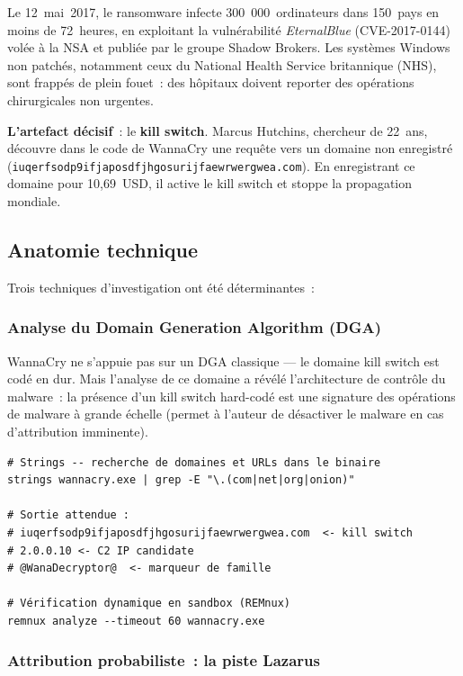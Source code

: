 Le 12~mai~2017, le ransomware  infecte 300~000~ordinateurs
dans 150~pays en moins de 72~heures, en exploitant la vulnérabilité
\textit{EternalBlue} (CVE-2017-0144) volée à la NSA et publiée par le
groupe Shadow Brokers. Les systèmes Windows non patchés, notamment ceux du
National Health Service britannique (NHS), sont frappés de plein fouet~:
des hôpitaux doivent reporter des opérations chirurgicales non urgentes.

\medskip

\textbf{L'artefact décisif}~: le \textbf{kill switch}. Marcus Hutchins,
chercheur de 22~ans, découvre dans le code de WannaCry une requête vers un
domaine non enregistré (\texttt{iuqerfsodp9ifjaposdfjhgosurijfaewrwergwea.com}).
En enregistrant ce domaine pour 10,69~USD, il active le kill switch et stoppe
la propagation mondiale.

\subsection{Anatomie technique}

Trois techniques d'investigation ont été déterminantes~:

\subsubsection{Analyse du Domain Generation Algorithm (DGA)}

WannaCry ne s'appuie pas sur un DGA classique --- le domaine kill switch
est codé en dur. Mais l'analyse de ce domaine a révélé l'architecture de
contrôle du malware~: la présence d'un kill switch hard-codé est une
signature des opérations de malware à grande échelle (permet à l'auteur de
désactiver le malware en cas d'attribution imminente).

\begin{lstlisting}[language=bash_forensique,
    caption={Extraction du kill switch depuis un binaire WannaCry}]
# Strings -- recherche de domaines et URLs dans le binaire
strings wannacry.exe | grep -E "\.(com|net|org|onion)"

# Sortie attendue :
# iuqerfsodp9ifjaposdfjhgosurijfaewrwergwea.com  <- kill switch
# 2.0.0.10 <- C2 IP candidate
# @WanaDecryptor@  <- marqueur de famille

# Vérification dynamique en sandbox (REMnux)
remnux analyze --timeout 60 wannacry.exe
\end{lstlisting}

\subsubsection{Attribution probabiliste~: la piste Lazarus}

